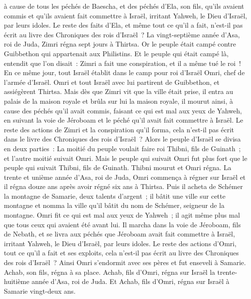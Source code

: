 \begin{multicols}{2}
à cause de tous les péchés de Baescha, et des péchés d'Ela, son fils, qu'ils avaient commis et qu'ils avaient fait commettre à Israël, irritant Yahweh, le Dieu d'Israël, par leurs idoles.
Le reste des faits d'Ela, et même tout ce qu'il a fait, n'est-il pas écrit au livre des Chroniques des rois d'Israël~?
La vingt-septième année d'Asa, roi de Juda, Zimri régna sept jours à Thirtsa. Or le peuple était campé contre Guibbethon qui appartenait aux Philistins.
Et le peuple qui était campé là, entendit que l'on disait~: Zimri a fait une conspiration, et il a même tué le roi~! En ce même jour, tout Israël établit dans le camp pour roi d'Israël Omri, chef de l'armée d'Israël.
Omri et tout Israël avec lui partirent de Guibbethon, et assiégèrent Thirtsa.
Mais dès que Zimri vit que la ville était prise, il entra au palais de la maison royale et brûla sur lui la maison royale, il mourut ainsi,
à cause des péchés qu'il avait commis, faisant ce qui est mal aux yeux de Yahweh, en suivant la voie de Jéroboam et le péché qu'il avait fait commettre à Israël.
Le reste des actions de Zimri et la conspiration qu'il forma, cela n'est-il pas écrit dans le livre des Chroniques des rois d'Israël~?
Alors le peuple d'Israël se divisa en deux parties~: La moitié du peuple voulait faire roi Thibni, fils de Guinath~; et l'autre moitié suivait Omri.
Mais le peuple qui suivait Omri fut plus fort que le peuple qui suivait Thibni, fils de Guinath. Thibni mourut et Omri régna.
La trente et unième année d'Asa, roi de Juda, Omri commença à régner sur Israël et il régna douze ans après avoir régné six ans à Thirtsa.
Puis il acheta de Schémer la montagne de Samarie, deux talents d'argent~; il bâtit une ville sur cette montagne et nomma la ville qu'il bâtit du nom de Schémer, seigneur de la montagne.
Omri fit ce qui est mal aux yeux de Yahweh~; il agit même plus mal que tous ceux qui avaient été avant lui.
Il marcha dans la voie de Jéroboam, fils de Nebath, et se livra aux péchés que Jéroboam avait fait commettre à Israël, irritant Yahweh, le Dieu d'Israël, par leurs idoles.
Le reste des actions d'Omri, tout ce qu'il a fait et ses exploits, cela n'est-il pas écrit au livre des Chroniques des rois d'Israël~?
Ainsi Omri s'endormit avec ses pères et fut enseveli à Samarie. Achab, son fils, régna à sa place.
Achab, fils d'Omri, régna sur Israël la trente-huitième année d'Asa, roi de Juda. Et Achab, fils d'Omri, régna sur Israël à Samarie vingt-deux ans.

\end{multicols}
